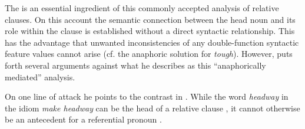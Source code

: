 \documentclass[output=paper,hidelinks]{langscibook}
\begin{document}
 \ea\label{nullproanaph}
\z

The   is an essential ingredient of this commonly accepted analysis of relative clauses.  On this account the semantic connection between the head noun and its role within the clause is established without a direct syntactic relationship.  This has the advantage that unwanted inconsistencies of any double-function syntactic feature values cannot arise (cf. the anaphoric solution for \textit{tough}).  However, \citet{falk2010} puts forth several arguments against what he describes as this ``anaphorically mediated'' analysis.

On one line of attack he points to the contrast in .  While the word \textit{headway} in the idiom \textit{make headway} can be the head of a relative clause , it cannot otherwise be an antecedent for a referential pronoun .

\ea\label{headway}
\label{headway1}
\label{headway2}
\z\z
\end{document}
